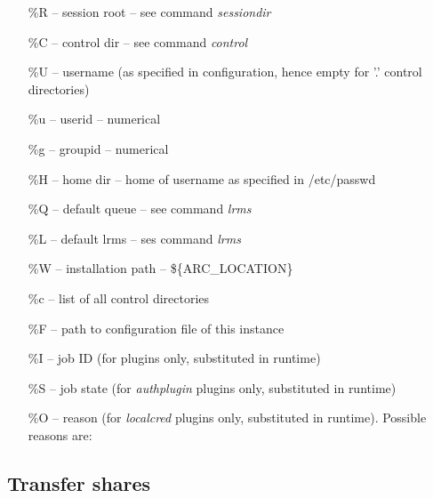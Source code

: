 \documentclass{article}                            %
\begin{document}
\begin{itemize}
\item [{\%R}] -- session root -- see command \emph{sessiondir}
\item [{\%C}] -- control dir -- see command \emph{control}
\item [{\%U}] -- username (as specified in configuration, hence empty for
'.' control directories)
\item [{\%u}] -- userid -- numerical
\item [{\%g}] -- groupid -- numerical
\item [{\%H}] -- home dir -- home of username as specified in /etc/passwd
\item [{\%Q}] -- default queue -- see command \emph{lrms}
\item [{\%L}] -- default lrms -- ses command \emph{lrms}
\item [{\%W}] -- installation path -- \$\{ARC\_LOCATION\}
\item [{\%c}] -- list of all control directories
\item [{\%F}] -- path to configuration file of this instance
\item [{\%I}] -- job ID (for plugins only, substituted in runtime)
\item [{\%S}] -- job state (for \emph{authplugin} plugins only, substituted
in runtime)
\item [{\%O}] -- reason (for \emph{localcred} plugins only, substituted
in runtime). Possible reasons are:
\end{itemize}

\subsection{Transfer shares\label{sub:Transfershare}}
\end{document}
